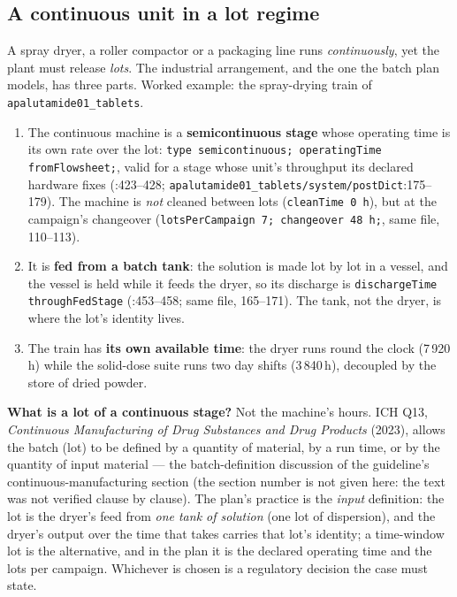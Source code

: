 \documentclass[11pt,a4paper]{article}
\providecommand{\tightlist}{\setlength{\itemsep}{0pt}\setlength{\parskip}{0pt}}
\begin{document}
\subsection{A continuous unit in a lot regime}\label{mp-continuous}

A spray dryer, a roller compactor or a packaging line runs
\emph{continuously}, yet the plant must release \emph{lots}. The
industrial arrangement, and the one the batch plan models, has three
parts. Worked example: the spray-drying train of
\texttt{apalutamide01\_tablets}.

\begin{enumerate}
\tightlist
\item
  The continuous machine is a \textbf{semicontinuous stage} whose
  operating time is its own rate over the lot:
  \texttt{type semicontinuous; operatingTime fromFlowsheet;}, valid for a
  stage whose unit's throughput its declared hardware fixes
  (:423--428;
  \texttt{apalutamide01\_tablets/system/postDict}:175--179). The
  machine is \emph{not} cleaned between lots (\texttt{cleanTime 0 h}),
  but at the campaign's changeover
  (\texttt{lotsPerCampaign 7; changeover 48 h;}, same file, 110--113).
\item
  It is \textbf{fed from a batch tank}: the solution is made lot by lot
  in a vessel, and the vessel is held while it feeds the dryer, so its
  discharge is \texttt{dischargeTime throughFedStage}
  (:453--458; same file, 165--171). The tank,
  not the dryer, is where the lot's identity lives.
\item
  The train has \textbf{its own available time}: the dryer runs round
  the clock (7\,920\,h) while the solid-dose suite runs two day shifts
  (3\,840\,h), decoupled by the store of dried powder.
\end{enumerate}
\textbf{What is a lot of a continuous stage?} Not the machine's
hours. ICH Q13, \emph{Continuous Manufacturing of Drug Substances and
Drug Products} (2023), allows the batch (lot) to be defined by a
quantity of material, by a run time, or by the quantity of input
material --- the batch-definition discussion of the guideline's
continuous-manufacturing section (the section number is not given here:
the text was not verified clause by clause). The plan's practice is the
\emph{input} definition: the lot is the dryer's feed from \emph{one
tank of solution} (one lot of dispersion), and the dryer's output over
the time that takes carries that lot's identity; a time-window lot is
the alternative, and in the plan it is the declared operating time and
the lots per campaign. Whichever is chosen is a regulatory decision the
case must state.
\end{document}
